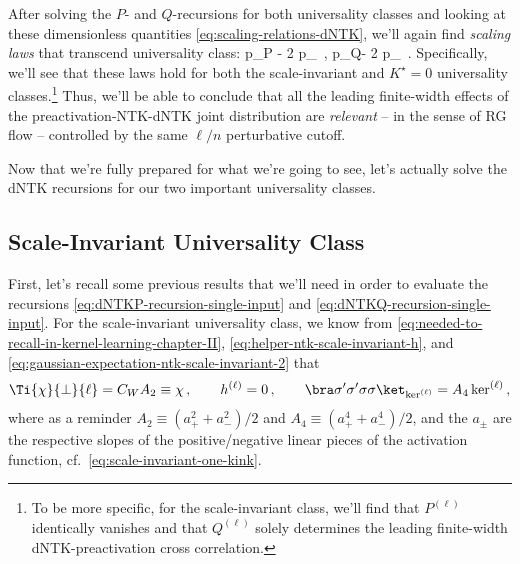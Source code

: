 After solving the $P$- and $Q$-recursions for both universality classes and looking at these dimensionless quantities \eqref{eq:scaling-relations-dNTK}, we'll again find \emph{scaling laws} that transcend universality class:
\be\label{eq:dNTK-scaling-laws}
p_P - 2 p_\, , \quad p_Q- 2 p_\, .
\ee
Specifically, we'll see that these laws hold for both the scale-invariant and $K^\star=0$ universality classes.\footnote{To be more specific, for the scale-invariant class, we'll find that $P^{(\ell)}$ identically vanishes and that $Q^{(\ell)}$ solely determines the leading finite-width dNTK-preactivation cross correlation.}
Thus, we'll be able to conclude that all the leading finite-width effects of the  preactivation-NTK-dNTK joint distribution are \emph{relevant} -- in the sense of RG flow -- controlled by the same $\ell/n$ perturbative cutoff.


Now that we're fully prepared for what we're going to see, let's actually solve the dNTK recursions for our two important universality classes.




\subsection{Scale-Invariant Universality Class}\label{subsec:dntk_criticality_scale_invariant}
First, let's recall some previous results that we'll need in order to evaluate the recursions \eqref{eq:dNTKP-recursion-single-input} and \eqref{eq:dNTKQ-recursion-single-input}. For the scale-invariant universality class, we know from \eqref{eq:needed-to-recall-in-kernel-learning-chapter-II}, \eqref{eq:helper-ntk-scale-invariant-h}, and \eqref{eq:gaussian-expectation-ntk-scale-invariant-2} that
\begin{align}\label{eq:dntk-prior-results-scale}
\Ti{\chi}{\perp}{\ell}=C_WA_2\equiv \chi\, , \qquad h^{(\ell)}=0\, , \qquad \bra\sigma^{\prime}\sigma^{\prime}\sigma\sigma\ket_{\ker^{(\ell)}}=A_4 \ker^{(\ell)}\, ,
\end{align}
where as a reminder $A_2\equiv (a_{+}^2+a_{-}^2)/2$ and $A_4\equiv (a_{+}^4+a_{-}^4)/2$, and the $a_{\pm}$ are the respective slopes of the positive/negative linear pieces of the activation function, cf.~\eqref{eq:scale-invariant-one-kink}.

